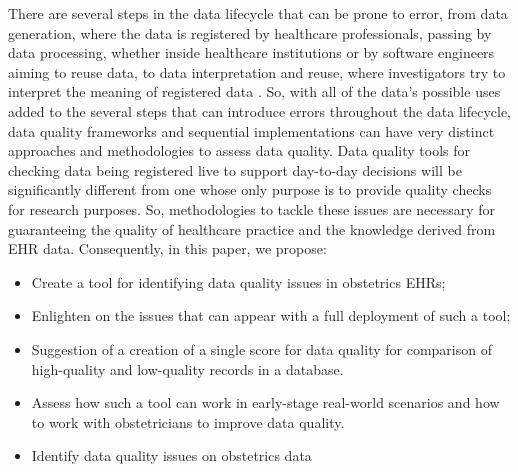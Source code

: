 There are several steps in the data lifecycle that can be prone to error, from data generation, where the data is registered by healthcare professionals, passing by data processing, whether inside healthcare institutions or by software engineers aiming to reuse data, to data interpretation and reuse, where investigators try to interpret the meaning of registered data \cite{wengClinicalDataQuality2020}.
So, with all of the data's possible uses added to the several steps that can introduce errors throughout the data lifecycle, data quality frameworks and sequential implementations can have very distinct approaches and methodologies to assess data quality. Data quality tools for checking data being registered live to support day-to-day decisions will be significantly different from one whose only purpose is to provide quality checks for research purposes. So, methodologies to tackle these issues are necessary for guaranteeing the quality of healthcare practice and the knowledge derived from EHR data. Consequently, in this paper, we propose:
\begin{itemize}
    \item Create a tool for identifying data quality issues in obstetrics EHRs;
    \item Enlighten on the issues that can appear with a full deployment of such a tool;
    \item Suggestion of a creation of a single score for data quality for comparison of high-quality and low-quality records in a database.
    \item Assess how such a tool can work in early-stage real-world scenarios and how to work with obstetricians to improve data quality.
    \item Identify data quality issues on obstetrics data
\end{itemize}




